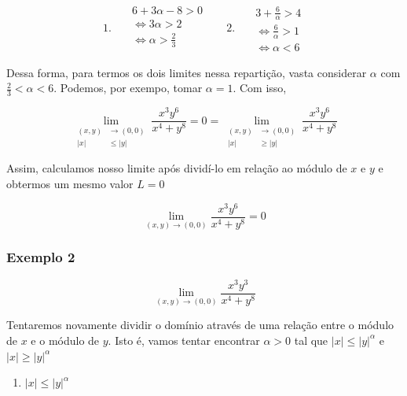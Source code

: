 \documentclass[
  letterpaper,
  DIV=11,
  numbers=noendperiod]{scrreprt}
\providecommand{\tightlist}{%
  \setlength{\itemsep}{0pt}\setlength{\parskip}{0pt}}\usepackage{longtable,booktabs,array}
\begin{document}
\[
1. ~~~
\begin{aligned}
  &6 + 3\alpha - 8 > 0 \\
  &\Leftrightarrow 3\alpha > 2 \\
  &\Leftrightarrow \alpha > \frac{2}{3} \\
\end{aligned} ~~~~~~~~
2. ~~~
\begin{aligned}
  &3 + \frac{6}{\alpha} > 4 \\
  &\Leftrightarrow \frac{6}{\alpha} > 1 \\
  &\Leftrightarrow \alpha < 6
\end{aligned}
\]

Dessa forma, para termos os dois limites nessa repartição, vasta
considerar \(\alpha\) com \(\frac{2}{3}<\alpha<6\). Podemos, por exempo,
tomar \(\alpha = 1\). Com isso,

\[
\lim_{\begin{aligned}
(x,y)&\rightarrow(0,0)\\ \lvert x \rvert &\leq \lvert y \rvert
\end{aligned}}
\frac{x^3y^6}{x^4+y^8} = 0 =
\lim_{\begin{aligned}
(x,y)&\rightarrow(0,0)\\ \lvert x \rvert &\geq \lvert y \rvert
\end{aligned}}
\frac{x^3y^6}{x^4+y^8}
\]

Assim, calculamos nosso limite após dividí-lo em relação ao módulo de
\(x\) e \(y\) e obtermos um mesmo valor \(L=0\)

\[
\lim_{(x,y)\rightarrow(0,0)}
\frac{x^3y^6}{x^4+y^8} = 0
\]

\subsubsection{Exemplo 2}\label{exemplo-2}

\[
\lim_{(x,y)\rightarrow (0,0)} \frac{x^3y^3}{x^4+y^8}
\]

Tentaremos novamente dividir o domínio através de uma relação entre o
módulo de \(x\) e o módulo de \(y\). Isto é, vamos tentar encontrar
\(\alpha>0\) tal que \(\lvert x \rvert \leq \lvert y \rvert^{\alpha}\) e
\(\lvert x \rvert \geq \lvert y \rvert^{\alpha}\)

\begin{enumerate}
\def\labelenumi{\arabic{enumi}.}
\tightlist
\item
  \(\lvert x \rvert \leq \lvert y \rvert^{\alpha}\)
\end{enumerate}
\end{document}

